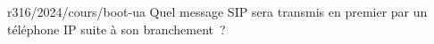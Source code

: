\begin{question}{r316/2024/cours/boot-ua}
  Quel message SIP sera transmis en premier par un téléphone IP
  suite à son branchement~?
  \begin{reponses}
  \end{reponses}
\end{question}
